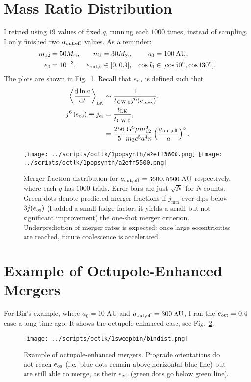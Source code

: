\documentclass[11pt,
        usenames, %
        dvipsnames %
    ]{article}
\newcommand*{\rd}[2]{\frac{\mathrm{d}#1}{\mathrm{d}#2}}
\newcommand*{\ev}[1]{\left\langle#1\right\rangle}
\newcommand*{\p}[1]{\left(#1\right)}
\begin{document}
\section{Mass Ratio Distribution}

I retried using $19$ values of fixed $q$, running each $1000$ times, instead of
sampling. I only finished two $a_{\rm out, eff}$ values. As a reminder:
\begin{align*}
    m_{12} &= 50M_{\odot}, &
    m_3 &= 30M_{\odot}, &
    a_0 &= 100\;\mathrm{AU}, \\
    e_0 &= 10^{-3},&
    e_{\rm out, 0} &\in [0, 0.9], &
    \cos I_0 &\in [\cos 50^\circ, \cos 130^\circ].
\end{align*}
The plots are shown in Fig.~\ref{fig:popsynth}. Recall that $e_{\rm os}$ is
defined such that
\begin{align}
    \ev{\rd{\ln a}{t}}_{\rm LK} &\sim \frac{1}{t_{\rm GW, 0}j^6(e_{\max})},\\
    j^6\p{e_{\rm os}} \equiv j_{\rm os}
        &= \frac{ t_{\rm LK}}{t_{\rm GW, 0}},\\
        &= \frac{256}{5}\frac{G^3 \mu m_{12}^3}{m_3c^5a^4n}
            \p{\frac{a_{\rm out, eff}}{a}}^3.
\end{align}
\begin{figure}[h]
    \centering
    \texttt{[image: ../scripts/octlk/1popsynth/a2eff3600.png]}
    \texttt{[image: ../scripts/octlk/1popsynth/a2eff5500.png]}
    \caption{Merger fraction distribution for $a_{\rm out, eff} = 3600,
    5500\;\mathrm{AU}$ respectively, where each $q$ has $1000$ trials. Error
    bars are just $\sqrt{N}$ for $N$ counts. Green dots denote predicted merger
    fractions if $j_{\min}$ ever dips below $3j(e_{\rm os})$ (I added a small
    fudge factor, it yields a small but not significant improvement) the
    one-shot merger criterion. Underprediction of merger rates is expected: once
    large eccentricities are reached, future coalescence is
    accelerated.}\label{fig:popsynth}
\end{figure}

\section{Example of Octupole-Enhanced Mergers}

For Bin's example, where $a_0 = 10\;\mathrm{AU}$ and $a_{\rm out, eff} =
300\;\mathrm{AU}$, I ran the $e_{\rm out} = 0.4$ case a long time ago. It shows
the octupole-enhanced case, see Fig.~\ref{fig:bindist}.
\begin{figure}
    \centering
    \texttt{[image: ../scripts/octlk/1sweepbin/bindist.png]}
    \caption{Example of octupole-enhanced mergers. Prograde orientations do not
    reach $e_{\rm os}$ (i.e.\ blue dots remain above horizontal blue line) but
    are still able to merge, as their $e_{\rm eff}$ (green
    dots go below green line).}\label{fig:bindist}
\end{figure}
\end{document}
